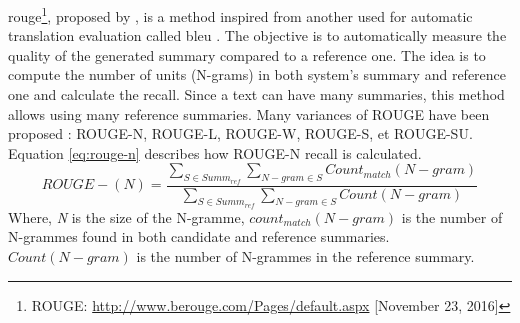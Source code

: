 \acf{rouge}\footnote{ROUGE: \url{http://www.berouge.com/Pages/default.aspx} [November 23, 2016]}, proposed by \citet{03-Lin-hovy}, is a method inspired from another used for automatic translation evaluation called \ac{bleu} \citep{02-papineni-al}. 
The objective is to automatically measure the quality of the generated summary compared to a reference one.
The idea is to compute the number of units (N-grams) in both system's summary and reference one and calculate the recall.
Since a text can have many summaries, this method allows using many reference summaries.
Many variances of ROUGE have been proposed \citep{04-lin}: ROUGE-N, ROUGE-L, ROUGE-W, ROUGE-S, et ROUGE-SU. 
Equation \ref{eq:rouge-n} describes how ROUGE-N recall is calculated.
\begin{equation}
	\label{eq:rouge-n}
	ROUGE-(N) = \frac{\sum_{S \in Summ_{ref}}{\sum_{N-gram \in S}{Count_{match} (N-gram)}}}
	{\sum_{S \in Summ_{ref}}{\sum_{N-gram \in S}{Count (N-gram)}}}
\end{equation}
Where, \textit{N} is the size of the N-gramme, 
$count_{match}(N-gram)$ is the number of N-grammes found in both candidate and reference summaries. 
$Count (N-gram)$ is the number of N-grammes in the reference summary. 

